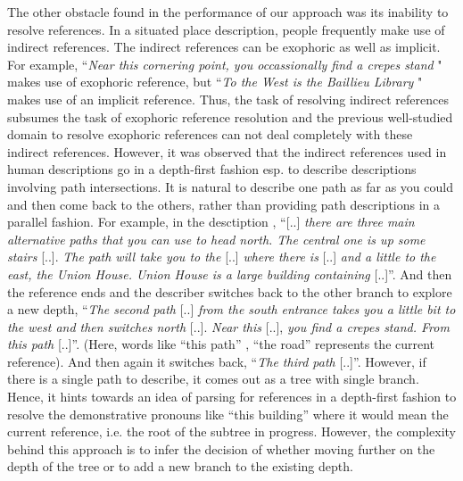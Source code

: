 \documentclass{acm_proc_article-sp}
\begin{document}
The other obstacle found in the performance of our approach was its inability to resolve references.
In a situated place description, people frequently make use of indirect references. The 
indirect references can be exophoric as well as implicit. For example, ``\textit{Near this cornering point, you occassionally find a crepes stand} "
 makes use of exophoric reference, but ``\textit{To the West is the Baillieu Library} " makes use of an implicit reference. Thus,
the task of resolving indirect references subsumes the task of exophoric reference resolution and 
the previous well-studied domain to resolve exophoric references can not deal completely with these indirect references.
However, it was observed that the indirect references used in human descriptions go in a
depth-first fashion esp. to describe descriptions involving path intersections. It is natural to
describe one path as far as you could and then come back to the others,
rather than providing path descriptions in a parallel fashion. For
example, in the desctiption , ``{[}..{]} \textit{there are three main
alternative paths that you can use to head north. The central one is up
some stairs} {[}..{]}. \textit{The path will take you to the} {[}..{]} \textit{where there
is} {[}..{]} \textit{and a little to the east, the Union House. Union House is a
large building containing} {[}..{]}''. And then the reference ends and the
describer switches back to the other branch to explore a new depth,
``\textit{The second path} {[}..{]} \textit{from the south entrance takes you a little
bit to the west and then switches north} {[}..{]}. \textit{Near this} {[}..{]},
\textit{you find a crepes stand. From this path }{[}..{]}''. (Here, words like
``this path'' , ``the road'' represents the current reference). And then
again it switches back, ``\textit{The third path} {[}..{]}''. 
However, if there is a single path to describe, it comes out as a tree with single branch.
Hence, it hints towards an idea of parsing for references in a depth-first fashion 
to resolve the demonstrative pronouns like ``this building'' where it would
mean the current reference, i.e. the root of the subtree in progress. 
However, the complexity behind this approach is to infer the decision of whether moving further on the depth
of the tree or to add a new branch to the existing depth. 
\end{document}
